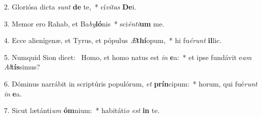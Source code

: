 2. Gloriósa dicta \textit{sunt} \textbf{de} te,~*  cí\textit{vi}\textit{tas} \textbf{De}i.\

3. Memor ero Rahab, et Ba\textit{by}\textbf{ló}nis~*  sci\textit{én}\textit{ti}\textbf{um} me.\

4. Ecce alienígenæ, et Tyrus, et pópulus \textit{Æ}\textbf{thí}opum,~*  hi fu\textit{é}\textit{runt} \textbf{il}lic.\

5. Numquid Sion dicet: \dag\  Homo, et homo natus est \textit{in} \textbf{e}a:~*  et ipse fundávit e\textit{am} \textit{Al}\textbf{tís}simus?\

6. Dóminus narrábit in scriptúris populórum, \textit{et} \textbf{prín}cipum:~*  horum, qui fué\textit{runt} \textit{in} \textbf{e}a.\

7. Sicut lætánti\textit{um} \textbf{óm}nium:~*  habitáti\textit{o} \textit{est} \textbf{in} te.\

